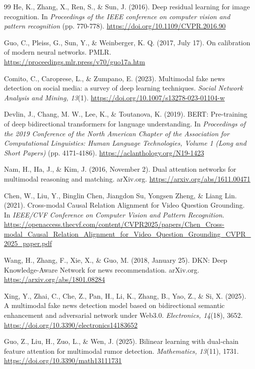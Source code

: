 \begin{thebibliography}{99}
He, K., Zhang, X., Ren, S., \& Sun, J. (2016). Deep residual learning for image recognition. In \textit{Proceedings of the IEEE conference on computer vision and pattern recognition} (pp. 770-778). \url{https://doi.org/10.1109/CVPR.2016.90}

Guo, C., Pleiss, G., Sun, Y., \& Weinberger, K. Q. (2017, July 17). On calibration of modern neural networks. PMLR. \url{https://proceedings.mlr.press/v70/guo17a.htm}

Comito, C., Caroprese, L., \& Zumpano, E. (2023). Multimodal fake news detection on social media: a survey of deep learning techniques. \textit{Social Network Analysis and Mining, 13}(1). \url{https://doi.org/10.1007/s13278-023-01104-w}

Devlin, J., Chang, M. W., Lee, K., \& Toutanova, K. (2019). BERT: Pre-training of deep bidirectional transformers for language understanding. In \textit{Proceedings of the 2019 Conference of the North American Chapter of the Association for Computational Linguistics: Human Language Technologies, Volume 1 (Long and Short Papers)} (pp. 4171-4186). \url{https://aclanthology.org/N19-1423}

Nam, H., Ha, J., \& Kim, J. (2016, November 2). Dual attention networks for multimodal reasoning and matching. arXiv.org. \url{https://arxiv.org/abs/1611.00471}

Chen, W., Liu, Y., Binglin Chen, Jiangdon Su, Yongsen Zheng, \& Liang Lin. (2021). Cross-modal Causal Relation Alignment for Video Question Grounding. In \textit{IEEE/CVF Conference on Computer Vision and Pattern Recognition}. \url{https://openaccess.thecvf.com/content/CVPR2025/papers/Chen_Cross-modal_Causal_Relation_Alignment_for_Video_Question_Grounding_CVPR_2025_paper.pdf}

Wang, H., Zhang, F., Xie, X., \& Guo, M. (2018, January 25). DKN: Deep Knowledge-Aware Network for news recommendation. arXiv.org. \url{https://arxiv.org/abs/1801.08284}

Xing, Y., Zhai, C., Che, Z., Pan, H., Li, K., Zhang, B., Yao, Z., \& Si, X. (2025). A multimodal fake news detection model based on bidirectional semantic enhancement and adversarial network under Web3.0. \textit{Electronics, 14}(18), 3652. \url{https://doi.org/10.3390/electronics14183652}

Guo, Z., Liu, H., Zuo, L., \& Wen, J. (2025). Bilinear learning with dual-chain feature attention for multimodal rumor detection. \textit{Mathematics, 13}(11), 1731. \url{https://doi.org/10.3390/math13111731}


\end{thebibliography}
